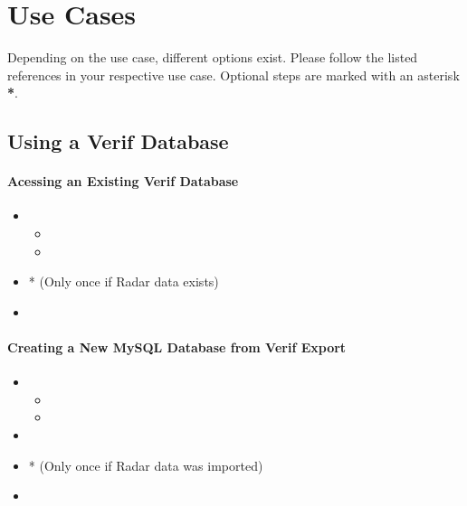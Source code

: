 \section{Use Cases}

Depending on the use case, different options exist. Please follow the listed references in your respective use case. Optional steps are marked with an asterisk \textbf{*}.

\subsection{Using a Verif Database}

\paragraph{Acessing an Existing Verif Database}

\begin{itemize}
\item {}
\begin{itemize}
 \item {}
 \item {}
 \end{itemize}
 \item {}* (Only once if Radar data exists)
 \item {}
\end{itemize}

\paragraph{Creating a New MySQL Database from Verif Export}

\begin{itemize}
\item {}
\begin{itemize}
 \item {}
 \item {}
 \end{itemize}
 \item {}
 \item {}* (Only once if Radar data was imported)
 \item {}
\end{itemize}

